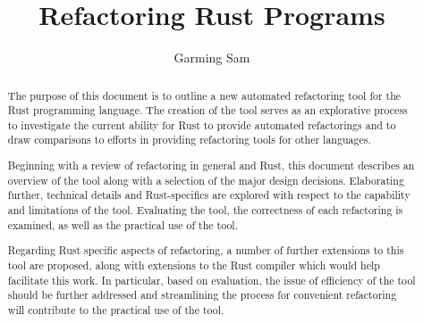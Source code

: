 \documentclass[11pt
              , a4paper
              , openright
              ]{report}
\title{Refactoring Rust Programs}
\author{Garming Sam}
\date{}
\begin{document}
\frontmatter



\begin{abstract}

The purpose of this document is to outline a new automated refactoring tool for the Rust programming language. The creation of the tool serves as an explorative process to investigate the current ability for Rust to provide automated refactorings and to draw comparisons to  efforts in providing refactoring tools for other languages. 

Beginning with a review of refactoring in general and Rust, this document describes an overview of the tool along with a selection of the major design decisions. Elaborating further, technical details and Rust-specifics are explored with respect to the capability and limitations of the tool. Evaluating the tool, the correctness of each refactoring is examined, as well as the practical use of the tool.

Regarding Rust specific aspects of refactoring, a number of further extensions to this tool are proposed, along with extensions to the Rust compiler which would help facilitate this work. In particular, based on evaluation, the issue of efficiency of the tool should be further addressed and streamlining the process for convenient refactoring will contribute to the practical use of the tool.



\end{abstract}
\end{document}
